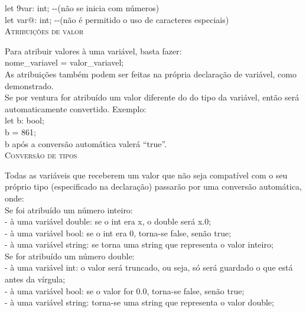 \documentclass[12pt,a4paper]{article}
\begin{document}
let 9var: int; -{}-(não se inicia com números)\\

let var@: int; -{}-(não é permitido o uso de caracteres especiais)\\

\hypertarget{label2}{\Large{\textsc{Atribuições de valor}}}\\[0.3cm]
\normalsize

Para atribuir valores à uma variável, basta fazer: \\

nome\_variavel = valor\_variavel; \\

As atribuições também podem ser feitas na própria declaração de variável, como demonstrado. \\

Se por ventura for atribuído um valor diferente do do tipo da variável, então será automaticamente convertido. Exemplo:\\

let b: bool; \\

b = 861;\\

b após a conversão automática valerá ``true''.\\

\hypertarget{label8}{\Large{\textsc{Conversão de tipos}}}\\[0.3cm]
\normalsize

Todas as variáveis que receberem um valor que não seja compatível com o seu próprio tipo (especificado na declaração) passarão por uma conversão automática, onde: \\

Se foi atribuído um número inteiro:\\[0.15cm]
- à uma variável double: se o int era x, o double será x.0;\\
- à uma variável bool: se o int era 0, torna-se false, senão true;\\
- à uma variável string: se torna uma string que representa o valor inteiro;\\[0.3cm]

Se for atribuído um número double:\\[0.15cm]
- à uma variável int: o valor será truncado, ou seja, só será guardado o que está antes da vírgula;\\
- à uma variável bool: se o valor for 0.0, torna-se false, senão true;\\
- à uma variável string: torna-se uma string que representa o valor double;\\[0.3cm]
\end{document}
